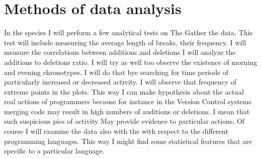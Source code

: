 \section{Methods of data analysis}

In the species I will perform a few analytical tests on The Gather the data. This test will include measuring the average length of breaks, their frequency. I will measure the correlations between additions and deletions I will analyze the additions to deletions ratio. I will try as well too observe the existence of morning and evening chronotypes. I will do that bye searching for time periods of particularly increased or decreased activity. I will observe that frequency of extreme points in the plots. This way I can make hypothesis about the actual real actions of programmers because for instance in the Version Control systems merging code may result in high numbers of auditions or deletions. I mean that such suspicious pics of activity May provide evidence to particular actions. Of course I will examine the data also with the with respect to the different programming languages. This way I might find some statistical features that are specific to a particular language.
